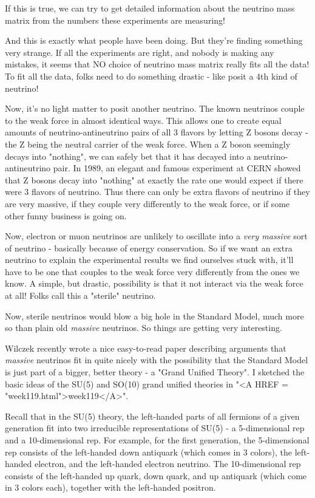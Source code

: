 If this is true, we can try to get detailed information about the
neutrino mass matrix from the numbers these experiments are measuring!

And this is exactly what people have been doing.  But they're finding
something very strange.  If all the experiments are right, and nobody is
making any mistakes, it seems that NO choice of neutrino mass matrix
really fits all the data!  To fit all the data, folks need to do
something drastic - like posit a 4th kind of neutrino!  

Now, it's no light matter to posit another neutrino.  The known
neutrinos couple to the weak force in almost identical ways.  This
allows one to create equal amounts of neutrino-antineutrino pairs of
all 3 flavors by letting Z bosons decay - the Z being the neutral
carrier of the weak force.   When a Z boson seemingly decays into
"nothing", we can safely bet that it has decayed into a neutrino-
antineutrino pair.  In 1989, an elegant and famous experiment at CERN
showed that Z bosons decay into "nothing" at exactly the 
rate one would
expect if there were 3 flavors of neutrino.  Thus there can only be
extra flavors of neutrino if they are very massive, if they couple very
differently to the weak force, or if some other funny business is going
on.

Now, electron or muon neutrinos are unlikely to oscillate into a 
\emph{very massive} sort of neutrino - basically because of energy conservation.
So if we want an extra neutrino to explain the experimental results 
we find ourselves stuck with, it'll have to be one that couples to the
weak force very differently from the ones we know.  A simple, but
drastic, possibility is that it not interact via the weak force at all!
Folks call this a "sterile" neutrino.  

Now, sterile neutrinos would blow a big hole in the Standard Model,
much more so than plain old \emph{massive} neutrinos.  So things are getting
very interesting.

Wilczek recently wrote a nice easy-to-read paper describing arguments
that \emph{massive} neutrinos fit in quite nicely with the possibility that
the Standard Model is just part of a bigger, better theory - a "Grand
Unified Theory".  I sketched the basic ideas of the SU(5) and SO(10)
grand unified theories in 
"<A HREF = "week119.html">week119</A>".  

Recall that in the SU(5) theory, 
the left-handed parts of all fermions of a given generation fit into two 
irreducible representations of SU(5) - a 5-dimensional rep and a 
10-dimensional rep.  For example, for the first generation, the 
5-dimensional rep consists of the left-handed down antiquark (which
comes in 3 colors), the left-handed electron, and the left-handed electron
neutrino.  The 10-dimensional rep consists of the left-handed up quark,
down quark, and up antiquark (which come in 3 colors each), together
with the left-handed positron.   

